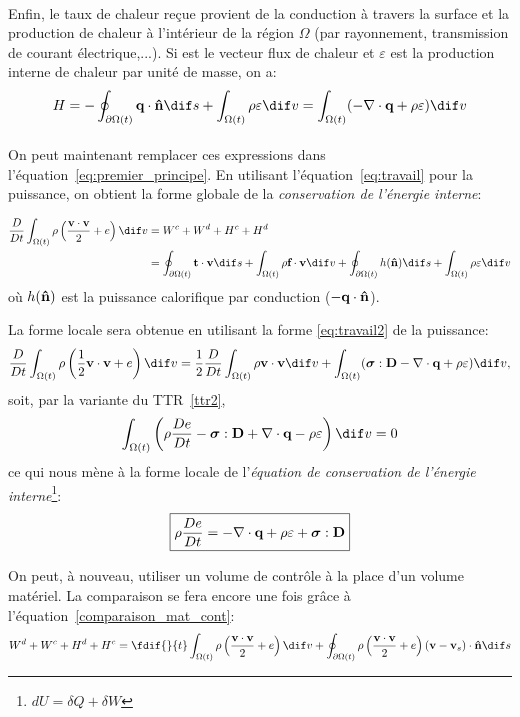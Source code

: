 \paragraph{}
Enfin, le taux de chaleur reçue provient de la conduction à travers la surface et la production de chaleur à l'intérieur de la région $\Omega$ (par rayonnement, transmission de courant électrique,...). Si  est le vecteur flux de chaleur et $\varepsilon$ est la production interne de chaleur par unité de masse, on a:
$$H=-\oint_{\partial \Omega (t)}\fv{q}\cdot\fv{\^n} \dif s+\int_{\Omega(t)}\rho\varepsilon \dif v=\int_{\Omega (t)}(-\nabla\cdot\fv{q}+\rho\varepsilon) \dif v$$
\paragraph{}
On peut maintenant remplacer ces expressions dans l'équation~\eqref{eq:premier_principe}.
En utilisant l'équation~\eqref{eq:travail} pour la puissance,
on obtient la forme globale de la \emph{conservation de l'énergie interne}:

\begin{align}
\frac{D}{Dt}\int_{\Omega (t)}\rho\left(\frac{\fv{v}\cdot\fv{v}}{2}+e\right) \dif v&= W^c+W^d+H^c+H^d\\
 &=\oint_{\partial \Omega (t)}\fv{t}\cdot\fv{v} \dif s+\int_{\Omega (t)}\rho\fv{f}\cdot\fv{v} \dif v+\oint_{\partial \Omega (t)}h(\fv{\^n}) \dif s+\int_{\Omega (t)}\rho\varepsilon \dif v
\end{align}
où $h(\textbf{\^n})$ est la puissance calorifique par conduction ($-\textbf{q}\cdot\textbf{\^n}$).

La forme locale sera obtenue en utilisant la forme \ref{eq:travail2} de la puissance:
$$\frac{D}{Dt}\int_{\Omega  (t)}\rho\left(\frac{1}{2}\fv{v}\cdot\fv{v}+e\right) \dif v=\frac{1}{2}\frac{D}{Dt}\int_{\Omega (t)}\rho\fv{v}\cdot\fv{v} \dif v+\int_{\Omega (t)}(\boldsymbol{\sigma}:\fv{D}-\nabla\cdot\fv{q}+\rho\varepsilon) \dif v,$$
soit, par la variante du TTR~\ref{ttr2},
$$\int_{\Omega (t)}\left(\rho\frac{De}{Dt}-\boldsymbol{\sigma}:\fv{D}+\nabla\cdot\fv{q}-\rho\varepsilon\right) \dif v=0$$
ce qui nous mène à la forme locale de l'\emph{équation de conservation de l'énergie interne}\footnote{$dU=\delta Q+\delta W$}:
$$\boxed{\rho\frac{De}{Dt}=-\nabla\cdot\textbf{q}+\rho\varepsilon+\boldsymbol{\sigma}:\textbf{D}}$$

On peut, à nouveau, utiliser un volume de contrôle à la place d'un volume matériel. La comparaison se fera encore une fois grâce à l'équation~\eqref{comparaison_mat_cont}:
\begin{equation}\label{energie_cont}W^d+W^c+H^d+H^c=\fdif{}{t}\int_{\Omega (t)}\rho\left(\frac{\fv{v}\cdot\fv{v}}{2}+e\right) \dif v+\oint_{\partial\Omega (t)}\rho\left(\frac{\fv{v}\cdot\fv{v}}{2}+e\right)(\fv{v}-\fv{v}_s)\cdot\fv{\^n} \dif s\end{equation}

